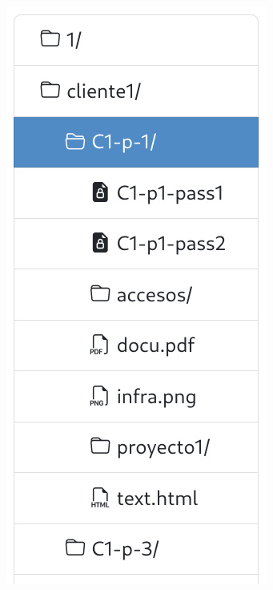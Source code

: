 \documentclass{\ClassPath/viu-tfm-template}
\begin{document}
{\begin{minipage}{0.3\linewidth}
\end{minipage}
\hfill
\begin{minipage}{0.3\linewidth}
    \includegraphics[width=\linewidth]{img/tree2.png}

\end{minipage}}
\end{document}
